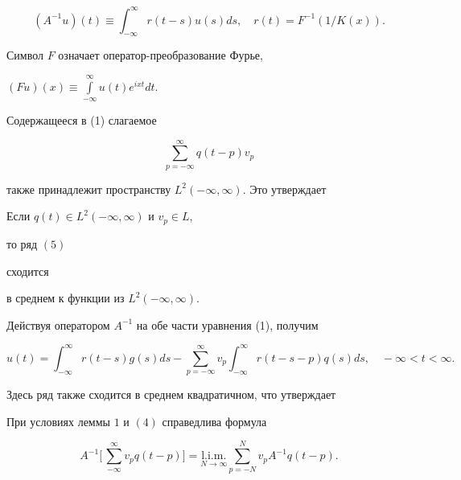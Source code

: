 $$ 


(A^{-1}u)(t)\equiv\int^\infty_{-\infty}r(t-s)u(s)ds,\quad 


r(t)=F^{-1}(1/K(x)). 


$$ 


Символ $F$ означает оператор-преобразование Фурье, 


$(F u)(x)\equiv\int\limits^\infty_{-\infty}u(t)e^{ixt}dt$. 


Содержащееся в (1) слагаемое 


\begin{equation} 


\sum^\infty_{p=-\infty}q(t-p)v_p 


\end{equation} 


также принадлежит пространству $L^2(-\infty,\infty)$. Это утверждает  


 


\begin{lem} Если $q(t)\in L^2(-\infty,\infty)$ и $v_p\in L$, 


то ряд $(5)$ 


сходится 


в среднем к функции из $L^2(-\infty,\infty)$. 


\end{lem} 


 


Действуя оператором $A^{-1}$ на обе части уравнения (1), получим 


\begin{equation} 


u(t)=\int^\infty_{-\infty}r(t-s)g(s)ds- 


\sum^\infty_{p=-\infty}v_p\int^\infty_{-\infty} 


r(t-s-p)q(s)ds,\quad -\infty<t<\infty. 


\end{equation} 


Здесь ряд также сходится в среднем квадратичном, что утверждает 


 


\begin{lem} При условиях леммы $1$ и $(4)$ справедлива формула 


$$ 


A^{-1}\bigg[\,\sum^\infty_{-\infty}v_p q(t-p)\bigg]= 


\underset{N\to\infty}{\mathrm{l.i.m.}}{}\sum^N_{p=-N}v_p A^{-1}q(t-p). 


$$ 


\end{lem} 


